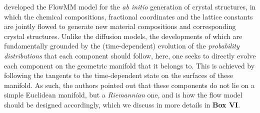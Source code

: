 \citet{miller2024flowmm} developed the FlowMM model for the \emph{ab initio} generation of crystal structures, in which the chemical compositions, fractional coordinates and the lattice constants are jointly flowed to generate new material compositions and corresponding crystal structures. Unlike the diffusion  models, the developments of which are fundamentally grounded by the (time-dependent) evolution of the \emph{probability distributions} that each component should follow, here, one seeks to directly evolve each component on the geometric manifold that it belongs to. This is achieved by following the tangents to the time-dependent state on the surfaces of these manifold. As such, the authors pointed out that these components do not lie on a simple Euclidean manifold, but a \emph{Riemannian} one, and is how the flow model should be designed accordingly, which we discuss in more details in \textbf{Box VI}.


